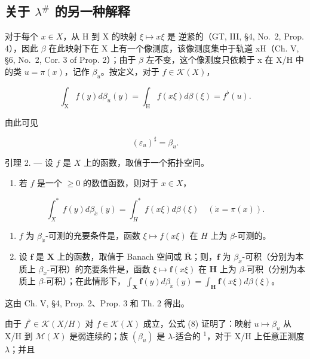 \subsection{\texorpdfstring{关于 \(\lambda^{\#}\) 的另一种解释}{关于 \textbackslash lambda\^{}\{\textbackslash\#\} 的另一种解释}}

对于每个 \(x \in X\)，从 H 到 X 的映射 \(\xi \mapsto x\xi\) 是 逆紧的（GT, III, §4, No.~2, Prop. 4），因此 \(\beta\) 在此映射下在 X 上有一个像测度，该像测度集中于轨道 xH（Ch. V, §6, No.~2, Cor. 3 of Prop. 2）；由于 \(\beta\) 左不变，这个像测度只依赖于 x 在 X/H 中的类 \(u = \pi(x)\)，记作 \(\beta_{u}\)。按定义，对于 \(f \in \mathcal{K}(X)\)，

\[
\int_ {\mathrm{X}} f (y) d \beta_ {u} (y) = \int_ {\mathrm{H}} f (x \xi) d \beta (\xi) = f ^ {\flat} (u).\tag{8}
\]

由此可见

\[
(\varepsilon_ {u}) ^ {\sharp} = \beta_ {u}.\tag{9}
\]

引理 2. --- 设 \(f\) 是 \(X\) 上的函数，取值于一个拓扑空间。

\begin{enumerate}
\def\labelenumi{\alph{enumi})}
\tightlist
\item
  若 \(f\) 是一个 \(\geqslant 0\) 的数值函数，则对于 \(x \in X\)，
\end{enumerate}

\[
\int_ {X} ^ {*} f (y) d \beta_ {\dot {x}} (y) = \int_ {H} ^ {*} f (x \xi) d \beta (\xi) \quad (\dot {x} = \pi (x)).
\]

\begin{enumerate}
\def\labelenumi{\alph{enumi})}
\setcounter{enumi}{1}
\item
  \(f\) 为 \(\beta_{\dot{x}}\)-可测的充要条件是，函数 \(\xi \mapsto f(x\xi)\) 在 \(H\) 上为 \(\beta\)-可测的。
\item
  设 \(\mathbf{f}\) 是 \(\mathbf{X}\) 上的函数，取值于 Banach 空间或 \(\overline{\mathbf{R}}\)；则，\(\mathbf{f}\) 为 \(\beta_{\dot{x}}\)-可积（分别为本质上 \(\beta_{\dot{x}}\)-可积）的充要条件是，函数 \(\xi \mapsto \mathbf{f}(x\xi)\) 在 \(\mathbf{H}\) 上为 \(\beta\)-可积（分别为本质上 \(\beta\)-可积）；在此情形下，\(\int_{\mathbf{X}} \mathbf{f}(y) d\beta_{\dot{x}}(y) = \int_{\mathbf{H}} \mathbf{f}(x\xi) d\beta(\xi)\)。
\end{enumerate}

这由 Ch. V, §4, Prop. 2、Prop. 3 和 Th. 2 得出。

由于 \(f^{\flat} \in \mathcal{K}(X/H)\) 对 \(f \in \mathcal{K}(X)\) 成立，公式 (8) 证明了：映射 \(u \mapsto \beta_{u}\) 从 X/H 到 \(\mathcal{M}(X)\) 是弱连续的；族 \((\beta_{u})\) 是 \(\lambda\)-适合的 \(^{1}\)，对于 X/H 上任意正测度 \(\lambda\)；并且

